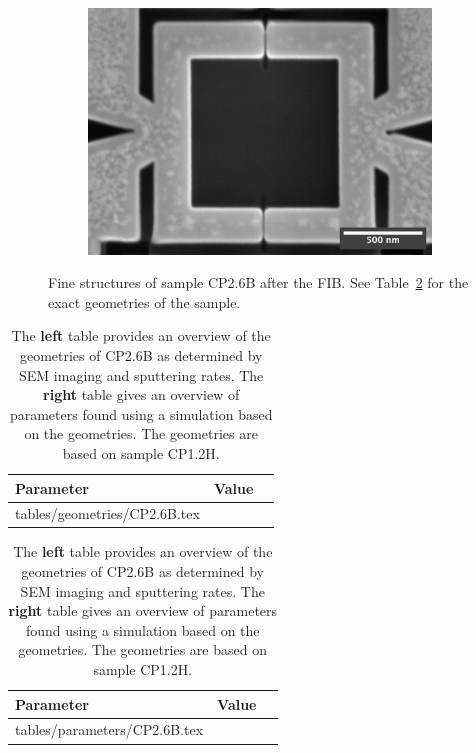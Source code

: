 \begin{figure}[ht!]
\begin{subfigure}[t]{0.3\textwidth}
	\end{subfigure}
	\hfill
	\begin{subfigure}[t]{0.3\textwidth}
		\centering
		\includegraphics[width=\textwidth]{figures/samples/CP2/CP2.6B_SEM_SQUID.jpg}
	\end{subfigure}

	\caption{Fine structures of sample CP2.6B after the FIB. See Table~\ref{tab:CP2.6B-geometries} for the exact geometries of the sample.}
	\label{fig:CP2.6B-SEM-images}
\end{figure}

\begin{table}
	\begin{subtable}{.6\linewidth}
		\begin{tabular}[t]{@{}lrr@{}}
			\toprule
			Parameter & Value \\ \midrule
			\expandableinput tables/geometries/CP2.6B.tex
			\bottomrule
		\end{tabular}
    \end{subtable}
    \hfill
    \begin{subtable}{.3\linewidth}
    	\flushright
    	\begin{tabular}[t]{@{}lrr@{}}
    		\toprule
    		Parameter & Value \\ \midrule
    		\expandableinput tables/parameters/CP2.6B.tex
    		\bottomrule
    	\end{tabular}
    \end{subtable}
    \caption{The \textbf{left} table provides an overview of the geometries of CP2.6B as determined by SEM imaging and sputtering rates. The \textbf{right} table gives an overview of parameters found using a simulation based on the geometries. The geometries are based on sample CP1.2H.}
    \label{tab:CP2.6B-geometries}
\end{table}